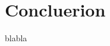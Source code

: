 \documentclass[
	a4paper, %
	10pt, %
]{CSUniSchoolLabReport}
\begin{document}
\section{Concluerion}

blabla


\printbibliography %

\end{document}
